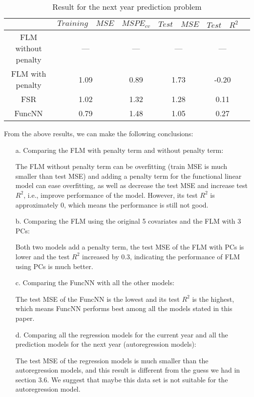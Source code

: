 \begin{table}[!htbp]
\centering
\begin{tabular}{cccccc}
   \toprule
   &$Training \quad MSE$ & $MSPE_{cv}$ & $Test\quad MSE$ & $Test\quad R^2$ \\
   \midrule
   FLM without penalty&---&---&---&--- \\
   FLM with penalty&1.09&0.89&1.73&-0.20\\
   FSR& 1.02&1.32&1.28&0.11\\
   FuncNN&0.79 &1.48 &1.05 &0.27\\
   \bottomrule
\end{tabular}
\caption{Result for the next year prediction problem}
\end{table}
\noindent 
From the above results, we can make the following conclusions:
\begin{itemize}
\item[a.] Comparing the FLM with penalty term and without penalty term:

The FLM without penalty term can be overfitting (train MSE is much smaller than test MSE) and adding a penalty term for the functional linear model can ease overfitting, as well as decrease the test MSE and increase test $R^2$, i.e., improve performance of the model. However, its test $R^2$ is approximately 0, which means the performance is still not good.
\item[b.] Comparing the FLM using the original 5 covariates and the FLM with 3 PCs:

Both two models add a penalty term, the test MSE of the FLM with PCs is lower and the test $R^2$ increased by 0.3, indicating the performance of FLM using PCs is much better.
\item[c.] Comparing the FuncNN with all the other models:

The test MSE of the FuncNN is the lowest and its test $R^2$ is the highest, which means FuncNN performs best among all the models stated in this paper.
\item[d.] Comparing all the regression models for the current year and all the prediction models for the next year (autoregression models):

The test MSE of the regression models is much smaller than the autoregression models, and this result is different from the guess we had in section 3.6. We suggest that maybe this data set is not suitable for the autoregression model.
\end{itemize}
